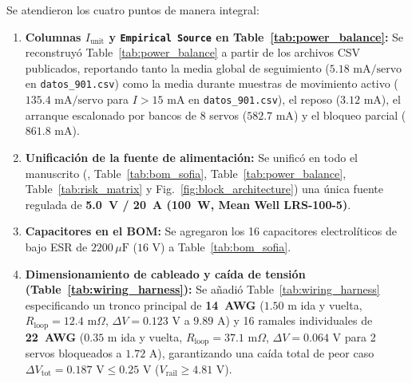 \documentclass{LabDSTresponse}
\begin{document}
{Se atendieron los cuatro puntos de manera integral:
\begin{enumerate}
    \item \textbf{Columnas $I_{\text{unit}}$ y \texttt{Empirical Source} en Table~\ref{tab:power_balance}:} Se reconstruyó Table~\ref{tab:power_balance} a partir de los archivos CSV publicados, reportando tanto la media global de seguimiento ($5.18\text{ mA/servo}$ en \texttt{datos\_901.csv}) como la media durante muestras de movimiento activo ($135.4\text{ mA/servo}$ para $I > 15\text{ mA}$ en \texttt{datos\_901.csv}), el reposo ($3.12\text{ mA}$), el arranque escalonado por bancos de 8 servos ($582.7\text{ mA}$) y el bloqueo parcial ($861.8\text{ mA}$).
    \item \textbf{Unificación de la fuente de alimentación:} Se unificó en todo el manuscrito (, Table~\ref{tab:bom_sofia}, Table~\ref{tab:power_balance}, Table~\ref{tab:risk_matrix} y Fig.~\ref{fig:block_architecture}) una única fuente regulada de \textbf{5.0~V / 20~A (100~W, Mean Well LRS-100-5)}.
    \item \textbf{Capacitores en el BOM:} Se agregaron los 16 capacitores electrolíticos de bajo ESR de $2200\,\mu\text{F}$ ($16\text{ V}$) a Table~\ref{tab:bom_sofia}.
    \item \textbf{Dimensionamiento de cableado y caída de tensión (Table~\ref{tab:wiring_harness}):} Se añadió Table~\ref{tab:wiring_harness} especificando un tronco principal de \textbf{14~AWG} ($1.50\text{ m}$ ida y vuelta, $R_{\text{loop}} = 12.4\text{ m}\Omega$, $\Delta V = 0.123\text{ V}$ a $9.89\text{ A}$) y 16 ramales individuales de \textbf{22~AWG} ($0.35\text{ m}$ ida y vuelta, $R_{\text{loop}} = 37.1\text{ m}\Omega$, $\Delta V = 0.064\text{ V}$ para 2 servos bloqueados a $1.72\text{ A}$), garantizando una caída total de peor caso $\Delta V_{\text{tot}} = 0.187\text{ V} \le 0.25\text{ V}$ ($V_{\text{rail}} \ge 4.81\text{ V}$).
\end{enumerate}}
\end{document}
